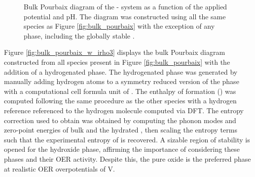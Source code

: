 \begin{figure}[!htb]
\centering
{}
\caption{\label{fig:bulk_pourbaix_wo_alpha}
%
Bulk Pourbaix diagram of the - system as a function of the applied potential and pH.
%
The diagram was constructed using all the same species as Figure \ref{fig:bulk_pourbaix} with the exception of any \IrOthree phase, including the globally stable \aIrOthree.
}
\end{figure}


%
%
Figure \ref{fig:bulk_pourbaix_w_irho3} displays the bulk Pourbaix diagram constructed from all species present in Figure \ref{fig:bulk_pourbaix} with the addition of a hydrogenated \aIrOthree phase.
%
The hydrogenated phase was generated by manually adding hydrogen atoms to a symmetry reduced version of the \aIrOthree phase with a computational cell formula unit of .
%
The enthalpy of formation (\DHf) was computed following the same procedure as the other species with a hydrogen reference referenced to the hydrogen molecule computed via DFT.
%
The entropy correction used to obtain \DGf was
obtained by computing the phonon modes and zero-point energies of bulk \rIrOtwo and the hydrated \aIrOthree, then scaling the entropy terms such that the experimental entropy of \rIrOtwo is recovered.
%
A sizable region of stability is opened for the hydroxide \aIrOthree phase,
affirming the importance of considering these phases and their OER activity.
%
Despite this, the pure oxide \aIrOthree is the preferred phase at realistic OER overpotentials of  V.


